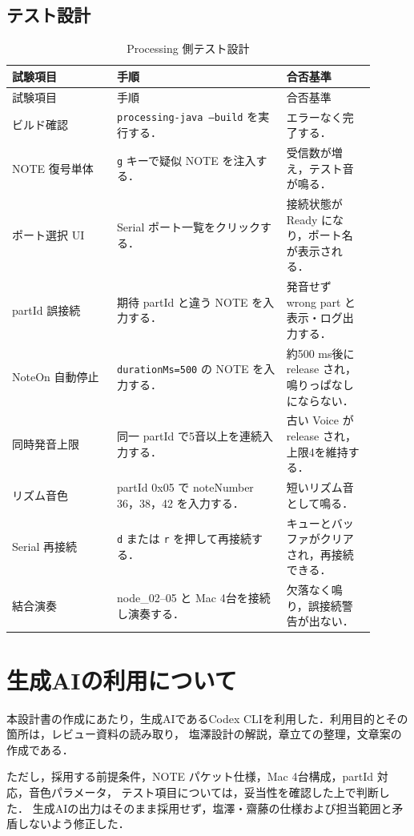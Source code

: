 \documentclass[lualatex,book,openany,paper=a4paper,jafontsize=11.5pt,jafontscale=1.05]{jlreq}
\begin{document}
\section{テスト設計}
\begin{longtable}{p{0.26\linewidth}p{0.42\linewidth}p{0.22\linewidth}}
\caption{Processing 側テスト設計}\label{tab:tests}\\
\toprule
試験項目 & 手順 & 合否基準 \\
\midrule
\endfirsthead
\toprule
試験項目 & 手順 & 合否基準 \\
\midrule
\endhead
ビルド確認 & \texttt{processing-java --build} を実行する． & エラーなく完了する． \\
NOTE 復号単体 & \texttt{g} キーで疑似 NOTE を注入する． & 受信数が増え，テスト音が鳴る． \\
ポート選択 UI & Serial ポート一覧をクリックする． & 接続状態が Ready になり，ポート名が表示される． \\
partId 誤接続 & 期待 partId と違う NOTE を入力する． & 発音せず wrong part と表示・ログ出力する． \\
NoteOn 自動停止 & \texttt{durationMs=500} の NOTE を入力する． & 約500 ms後に release され，鳴りっぱなしにならない． \\
同時発音上限 & 同一 partId で5音以上を連続入力する． & 古い Voice が release され，上限4を維持する． \\
リズム音色 & partId 0x05 で noteNumber 36，38，42 を入力する． & 短いリズム音として鳴る． \\
Serial 再接続 & \texttt{d} または \texttt{r} を押して再接続する． & キューとバッファがクリアされ，再接続できる． \\
結合演奏 & node\_02--05 と Mac 4台を接続し演奏する． & 欠落なく鳴り，誤接続警告が出ない． \\
\bottomrule
\end{longtable}

\chapter{生成AIの利用について}
本設計書の作成にあたり，生成AIであるCodex CLIを利用した．利用目的とその箇所は，レビュー資料の読み取り，
塩澤設計の解説，章立ての整理，文章案の作成である．

ただし，採用する前提条件，NOTE パケット仕様，Mac 4台構成，partId 対応，音色パラメータ，
テスト項目については，妥当性を確認した上で判断した．
生成AIの出力はそのまま採用せず，塩澤・齋藤の仕様および担当範囲と矛盾しないよう修正した．
\end{document}
